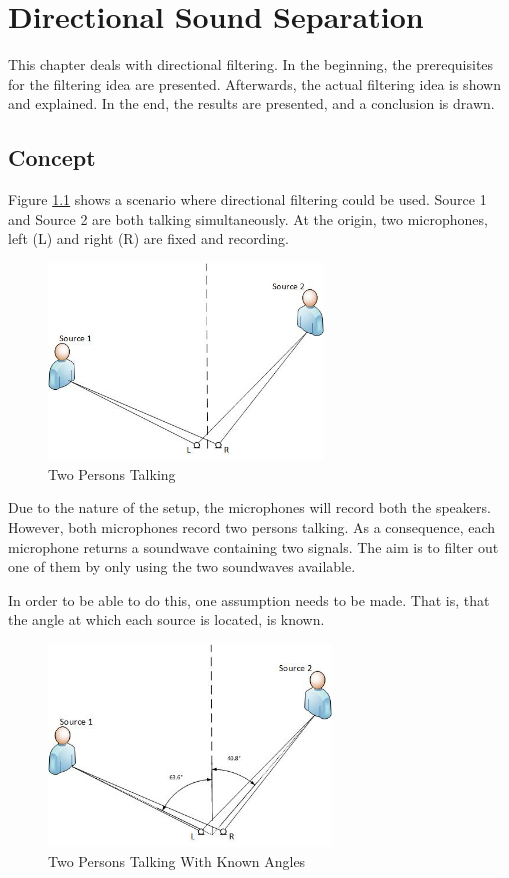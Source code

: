 \chapter{Directional Sound Separation}\label{ch:directional}
This chapter deals with directional filtering. In the beginning, the prerequisites 
for the filtering idea are presented. Afterwards, the actual filtering idea is 
shown and explained. In the end, the results are presented, and a conclusion is 
drawn.
\section{Concept}
Figure \ref{fig:2sources} shows a scenario where directional filtering could be 
used. Source 1 and Source 2 are both talking simultaneously. At the origin, two 
microphones, left (L) and right (R) are fixed and recording.

\begin{figure}[htp]
	\centering
	\includegraphics[width=0.65\textwidth]{Illustrations/2sources.jpg}
	\caption{Two Persons Talking}
	\label{fig:2sources}
\end{figure}

Due to the nature of the setup, the microphones will record  both the speakers.
However, both microphones record two persons talking. As a consequence, each 
microphone returns a soundwave containing two signals. The aim is to filter out one 
of them by only using the two soundwaves available.

In order to be able to do this, one assumption needs to be made. That is, that the 
angle at which each source is located, is known.

\begin{figure}[htp]
	\centering
	\includegraphics[width=0.67\textwidth]{Illustrations/2sourcesWangles.jpg}
	\caption{Two Persons Talking With Known Angles}
	\label{fig:2sourcesWangles}
\end{figure}

